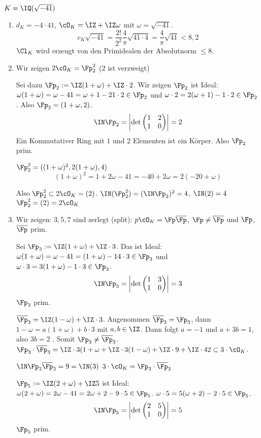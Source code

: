  \begin{Beispiel}
  $K=\IQ(\sqrt{-41})$
  \begin{enumerate}
   \item $d_K=-4\cdot 41$, $\cO_K=\IZ+\IZ\omega$ mit $\omega=\sqrt{-41}$.
   \[ c_K\sqrt{-41}=\frac{2!}{2^2}\frac{4}{\pi}\sqrt{41\cdot 4}=\frac{4}{\pi} \sqrt{41} < 8,2\]
   \folge $\Cl_K$ wird erzeugt von den Primidealen der Absolutnorm $\leq 8$.
   \item Wir zeigen $2\cO_K=\Fp_2^2$ ($2$ ist verzweigt)
   
   Sei dazu $\Fp_2:=\IZ(1+\omega)+\IZ\cdot 2$. Wir zeigen $\Fp_2$ ist Ideal: $\omega(1+\omega)=\omega-41=\omega+1-21\cdot 2\in\Fp_2$ und $\omega\cdot 2=2(\omega+1)-1\cdot 2\in\Fp_2$. Also $\Fp_2=(1+\omega,2)$.
   \[ \IN\Fp_2=\left|\det\begin{pmatrix} 1&2\\1&0 \end{pmatrix}\right|=2\]
   Ein Kommutativer Ring mit $1$ und 2 Elementen ist ein Körper. Also $\Fp_2$ prim.
   
   $\Fp_2^2=((1+\omega)^2,2(1+\omega),4)$
   \[ (1+\omega)^2=1+2\omega-41=-40+2\omega=2(-20+\omega)\]
   
   Also $\Fp_2^2\subset 2\cO_K=(2)$. $\IN(\Fp_2^2)=(\IN\Fp_2)^2=4$, $\IN(2)=4$ \folge $\Fp_2^2=(2)=2\cO_K$
   
   \item Wir zeigen: $3,5,7$ sind zerlegt (split): $p\cO_K=\Fp\overline\Fp$, $\Fp\neq\overline\Fp$ und $\Fp$,$\overline{\Fp}$ prim.
   
   Sei $\Fp_3:=\IZ(1+\omega)+\IZ\cdot 3$. Das ist Ideal: $\omega(1+\omega)=\omega-41=(1+\omega)-14\cdot 3\in\Fp_3$ und $\omega\cdot 3=3(1+\omega)-1\cdot 3\in\Fp_3$.
   \[ \IN\Fp_3=\left|\det\begin{pmatrix} 1&3\\1&0 \end{pmatrix}\right|=3\]
   \folge $\Fp_3$ prim.
   
   $\overline\Fp_3=\IZ(1-\omega)+\IZ\cdot 3$. Angenommen $\overline\Fp_3=\Fp_3$, dann $1-\omega=a(1+\omega)+b\cdot 3$ mit $a,b\in \IZ$. Dann folgt $a=-1$ und $a+3b=1$, also $3b=2$ \lightning.
   Somit $\Fp_3\neq\overline\Fp_3$. $\Fp_3\cdot\overline\Fp_3=\IZ\cdot 3(1+\omega+\IZ\cdot 3(1-\omega) + \IZ\cdot 9 + \IZ\cdot 42 \subset 3\cdot \cO_K$.
   
   $\IN\Fp_3\overline\Fp_3=9=\IN(3)$ \folge $3\cdot \cO_K=\Fp_3\cdot\overline\Fp_3$
   
   $\Fp_5:=\IZ(2+\omega) + \IZ 5$ ist Ideal: $\omega(2+\omega)=2\omega-41=2\omega+2-9\cdot 5 \in\Fp_5$. $\omega\cdot 5 = 5(\omega+2)-2\cdot 5\in\Fp_5$.
   \[ \IN\Fp_5 = \left|\det\begin{pmatrix}
                       2 & 5\\ 1 & 0
                      \end{pmatrix}
\right|=5\]
\folge $\Fp_5$ prim.


\end{enumerate}
\end{Beispiel}
